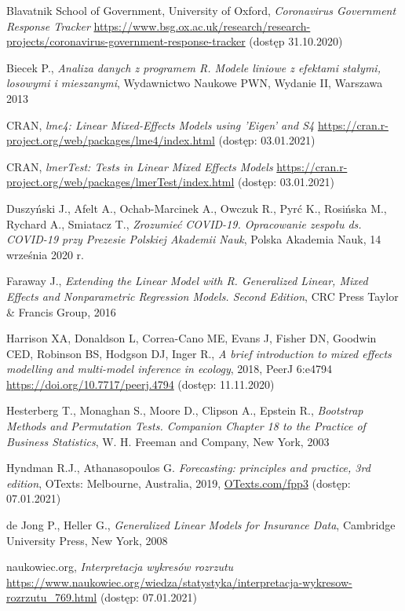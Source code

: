 \documentclass[12pt]{mwbk}
\theoremstyle{plain}
\theoremstyle{definition}
\theoremstyle{definition}
\begin{document}
\begin{thebibliography}{99}

 Blavatnik School of Government, University of Oxford, \emph{Coronavirus Government Response Tracker} \url{https://www.bsg.ox.ac.uk/research/research-projects/coronavirus-government-response-tracker} (dostęp 31.10.2020)

 Biecek P., \emph{Analiza danych z programem R. Modele liniowe z efektami stałymi, losowymi i mieszanymi}, Wydawnictwo Naukowe PWN, Wydanie II, Warszawa 2013

 CRAN, \emph{lme4: Linear Mixed-Effects Models using 'Eigen' and S4} \url{https://cran.r-project.org/web/packages/lme4/index.html} (dostęp: 03.01.2021)

 CRAN, \emph{lmerTest: Tests in Linear Mixed Effects Models} \url{https://cran.r-project.org/web/packages/lmerTest/index.html} (dostęp: 03.01.2021)

  Duszyński J., Afelt A.,  Ochab-Marcinek A.,
Owczuk R.,  Pyrć K.,  Rosińska M.,
Rychard A.,  Smiatacz T., \emph{Zrozumieć COVID-19. Opracowanie zespołu ds. COVID-19 przy Prezesie Polskiej Akademii Nauk}, Polska Akademia Nauk, 14 września 2020 r.

 Faraway J., \emph{Extending the Linear Model with R. Generalized Linear, Mixed Effects and Nonparametric Regression Models. Second Edition}, CRC Press Taylor \& Francis  Group, 2016

  Harrison XA, Donaldson L, Correa-Cano ME, Evans J, Fisher DN, Goodwin CED, Robinson BS, Hodgson DJ, Inger R., \emph{A brief introduction to mixed effects modelling and multi-model inference in ecology}, 2018, PeerJ 6:e4794 \url{https://doi.org/10.7717/peerj.4794} (dostęp: 11.11.2020)

 Hesterberg T.,  Monaghan S., Moore D., Clipson A., Epstein R., \emph{Bootstrap Methods and Permutation Tests. Companion Chapter 18 to the Practice of Business Statistics}, W. H. Freeman and Company, New York, 2003


 Hyndman R.J.,  Athanasopoulos G. \emph{Forecasting: principles and practice, 3rd edition}, OTexts: Melbourne, Australia, 2019, \url{OTexts.com/fpp3} (dostęp: 07.01.2021)

 de Jong P., Heller G., \emph{Generalized Linear Models for Insurance Data}, Cambridge University Press, New York, 2008

 naukowiec.org, \emph{Interpretacja wykresów rozrzutu} \url{https://www.naukowiec.org/wiedza/statystyka/interpretacja-wykresow-rozrzutu_769.html} (dostęp: 07.01.2021)


\end{thebibliography}
\end{document}
